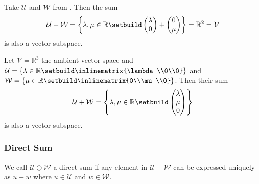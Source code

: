 \begin{exm}
	Take $\mathcal{U}$ and $\mathcal{W}$ from .
	Then the sum
	\begin{equation*}
		\mathcal{U}+\mathcal{W}=\left\{
		\lambda,\mu\in\mathbb{R}\setbuild
		\begin{pmatrix}
			\lambda \\0
		\end{pmatrix}+
		\begin{pmatrix}
			0 \\\mu
		\end{pmatrix}
		\right\}=\mathbb{R}^2=\mathcal{V}
	\end{equation*}
	is also a vector subspace.
\end{exm}

\begin{exm}
	Let $\mathcal{V}=\mathbb{R}^3$ the ambient vector space and
	$\mathcal{U}=\left\{\lambda\in\mathbb{R}\setbuild\inlinematrix{\lambda\\0\\0}\right\}$
	and
	$\mathcal{W}=\left\{\mu\in\mathbb{R}\setbuild\inlinematrix{0\\\mu\\0}\right\}$.
	Then their sum
	\begin{equation*}
		\mathcal{U}+\mathcal{W}=\left\{
		\lambda,\mu\in\mathbb{R}\setbuild
		\begin{pmatrix}
			\lambda \\\mu\\0
		\end{pmatrix}
		\right\}
	\end{equation*}
	is also a vector subspace.
\end{exm}

\subsubsection{Direct Sum}\label{subsubsec-direct-sum}

\begin{definition}\label{def-direct-sum}
	We call $\mathcal{U}\oplus\mathcal{W}$ a direct sum if any element in
	$\mathcal{U}+\mathcal{W}$ can be expressed uniquely as $u+w$ where
	$u\in\mathcal{U}$ and $w\in\mathcal{W}$.
\end{definition}

